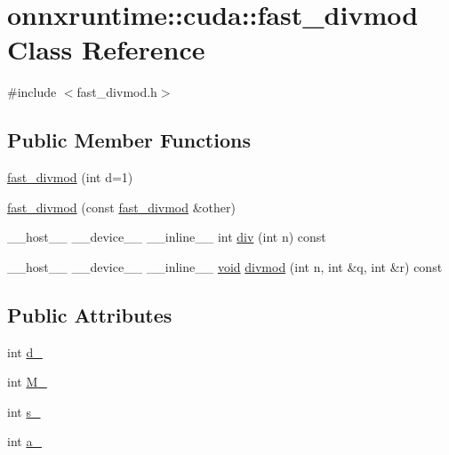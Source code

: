 \hypertarget{classonnxruntime_1_1cuda_1_1fast__divmod}{}\section{onnxruntime\+:\+:cuda\+:\+:fast\+\_\+divmod Class Reference}
\label{classonnxruntime_1_1cuda_1_1fast__divmod}


{\ttfamily \#include $<$fast\+\_\+divmod.\+h$>$}

\subsection*{Public Member Functions}
\begin{DoxyCompactItemize}
\item 
\mbox{\hyperlink{classonnxruntime_1_1cuda_1_1fast__divmod_a4158333beb64675bc74154b3db775de0}{fast\+\_\+divmod}} (int d=1)
\item 
\mbox{\hyperlink{classonnxruntime_1_1cuda_1_1fast__divmod_a51a29670c2f4a2b32c19a381bc2d36fa}{fast\+\_\+divmod}} (const \mbox{\hyperlink{classonnxruntime_1_1cuda_1_1fast__divmod}{fast\+\_\+divmod}} \&other)
\item 
\+\_\+\+\_\+host\+\_\+\+\_\+ \+\_\+\+\_\+device\+\_\+\+\_\+ \+\_\+\+\_\+inline\+\_\+\+\_\+ int \mbox{\hyperlink{classonnxruntime_1_1cuda_1_1fast__divmod_a01dd2361e9c2501844096b75ec09fc7e}{div}} (int n) const
\item 
\+\_\+\+\_\+host\+\_\+\+\_\+ \+\_\+\+\_\+device\+\_\+\+\_\+ \+\_\+\+\_\+inline\+\_\+\+\_\+ \mbox{\hyperlink{mlasi_8h_a88f941d423cb2a819b70a1358982b1a6}{void}} \mbox{\hyperlink{classonnxruntime_1_1cuda_1_1fast__divmod_a1cb25fb4e45f0bf9f72519ba74f105bb}{divmod}} (int n, int \&q, int \&r) const
\end{DoxyCompactItemize}
\subsection*{Public Attributes}
\begin{DoxyCompactItemize}
\item 
int \mbox{\hyperlink{classonnxruntime_1_1cuda_1_1fast__divmod_a340c9941ff6f111eb0147600d19e20fd}{d\+\_\+}}
\item 
int \mbox{\hyperlink{classonnxruntime_1_1cuda_1_1fast__divmod_a03a36ccb1df777a8817d0f8270d75588}{M\+\_\+}}
\item 
int \mbox{\hyperlink{classonnxruntime_1_1cuda_1_1fast__divmod_a671b6ccdbe89754ad88f5fa7d4e249ce}{s\+\_\+}}
\item 
int \mbox{\hyperlink{classonnxruntime_1_1cuda_1_1fast__divmod_aeebbde21ee4a92d3fc1c043ec52cba12}{a\+\_\+}}
\end{DoxyCompactItemize}


